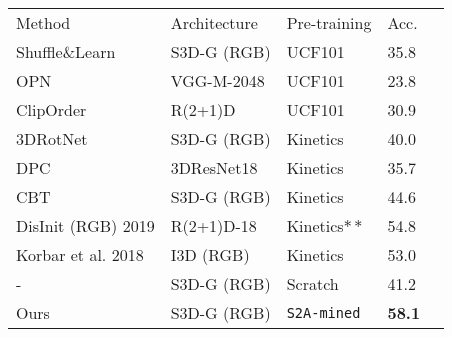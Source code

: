 
\centering 
\footnotesize{
\begin{tabular}{l l l l r}
\toprule
Method & Architecture  & Pre-training & Acc. \\
\arrayrulecolor{GrayLine}

\midrule
Shuffle\&Learn & S3D-G (RGB) & UCF101& 35.8\\
OPN   & VGG-M-2048  & UCF101  & 23.8 \\
ClipOrder  & R(2+1)D  & UCF101   & 30.9 \\
3DRotNet & S3D-G (RGB)  & Kinetics   &  40.0 \\
DPC  & 3DResNet18 & Kinetics & 35.7 \\
CBT  & S3D-G (RGB) & Kinetics   & 44.6 \\
\midrule 
DisInit (RGB) 2019 & R(2+1)D-18 & Kinetics$**$  & 54.8 \\  
Korbar et al. 2018  & I3D (RGB) & Kinetics  & 53.0 \\  

\midrule 
- & S3D-G (RGB) & Scratch& 41.2 \\ 
Ours & S3D-G (RGB)  & \texttt{S2A-mined}  & \textbf{58.1} \\
\bottomrule
\end{tabular}}
\label{tab:sota-hmdb}